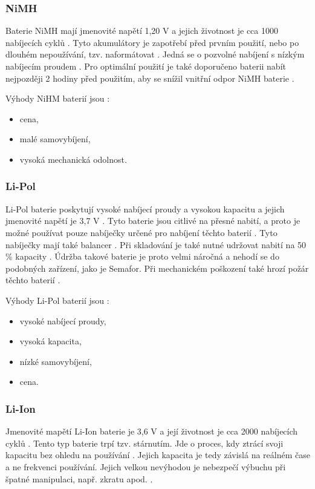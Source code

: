 \subsubsection{NiMH}
Baterie NiMH mají jmenovité napětí 1,20 V a jejich životnost je cca 1000 nabíjecích cyklů \cite{akumulatory}. Tyto akumulátory je zapotřebí před prvním použití, nebo po 
dlouhém nepoužívání, tzv. naformátovat \cite{akumulatory}. 
Jedná se o pozvolné nabíjení s nízkým nabíjecím proudem \cite{akumulatory}. Pro optimální použití je také doporučeno baterii nabít nejpozději 2 hodiny před použitím, aby se 
snížil vnitřní odpor NiMH baterie \cite{akumulatory}.

Výhody NiHM baterií jsou \cite{akumulatory}:
\begin{itemize}
  \item cena,
  \item malé samovybíjení,
  \item vysoká mechanická odolnost.
\end{itemize}

\subsubsection{Li-Pol}
Li-Pol baterie poskytují vysoké nabíjecí proudy a vysokou kapacitu a jejich jmenovité napětí je 3,7 V \cite{akumulatory}. Tyto baterie jsou citlivé na přesné nabití, a proto 
je možné používat pouze nabíječky určené pro nabíjení těchto baterií \cite{akumulatory}. Tyto nabíječky mají také balancer \cite{akumulatory}. Při skladování je také nutné 
udržovat nabití na 50 \% kapacity \cite{akumulatory}. Údržba takové baterie je proto velmi náročná a nehodí se do podobných zařízení, jako je Semafor. Při mechanickém poškození 
také hrozí požár těchto baterií \cite{akumulatory}.

Výhody Li-Pol baterií jsou \cite{akumulatory}:
\begin{itemize}
  \item vysoké nabíjecí proudy, 
  \item vysoká kapacita, 
  \item nízké samovybíjení,
  \item cena.
\end{itemize}

\subsubsection{Li-Ion}
Jmenovité mapětí Li-Ion baterie je 3,6 V a její životnost je cca 2000 nabíjecích cyklů \cite{Li-Ion}. Tento typ baterie trpí tzv. stárnutím. Jde o proces, kdy ztrácí 
svoji kapacitu bez ohledu na používání \cite{Li-Ion}. Jejich kapacita je tedy závislá na reálném čase a ne frekvenci používání. Jejich velkou nevýhodou je nebezpečí 
výbuchu při špatné manipulaci, např. zkratu apod. \cite{Li-Ion}. 

